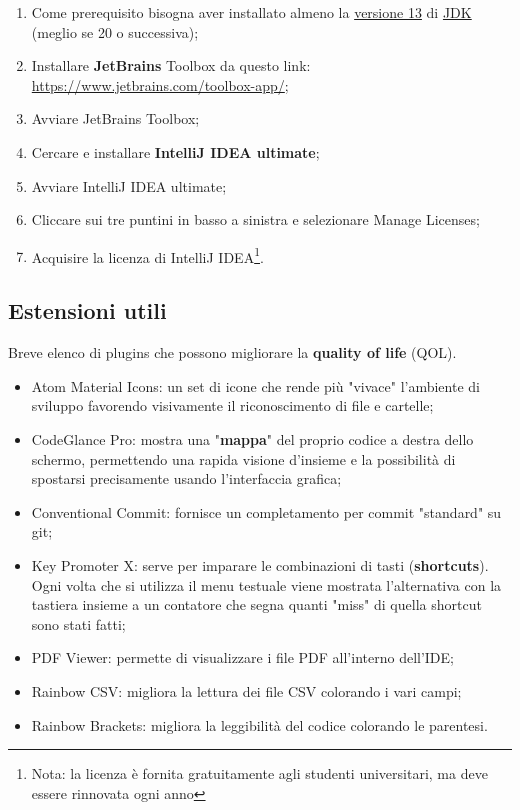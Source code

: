 \begin{enumerate}
    \item Come prerequisito bisogna aver installato almeno la \underline{versione 13} di \href{https://www.oracle.com/it/java/technologies/downloads/\#jdk21-windows}{JDK} (meglio se 20 o successiva);
    \item Installare \textbf{JetBrains} Toolbox da questo link: \href{https://www.jetbrains.com/toolbox-app/}{https://www.jetbrains.com/toolbox-app/};
    \item Avviare JetBrains Toolbox;
    \item Cercare e installare \textbf{IntelliJ IDEA ultimate};
    \item Avviare IntelliJ IDEA ultimate;
    \item Cliccare sui tre puntini in basso a sinistra e selezionare Manage Licenses;
    \item Acquisire la licenza di IntelliJ IDEA\footnote{Nota: la licenza è fornita gratuitamente agli studenti universitari, ma deve essere rinnovata ogni anno}.
\end{enumerate}


\subsection{Estensioni utili}

Breve elenco di plugins che possono migliorare la \textbf{quality of life} (QOL).

\begin{itemize}
    \item Atom Material Icons: un set di icone che rende più "vivace" l'ambiente di sviluppo favorendo visivamente il riconoscimento di file e cartelle;
    \item CodeGlance Pro: mostra una "\textbf{mappa}" del proprio codice a destra dello schermo, permettendo una rapida visione d'insieme e la possibilità di spostarsi precisamente usando l'interfaccia grafica;
    \item Conventional Commit: fornisce un completamento per commit "standard" su git;
    \item Key Promoter X: serve per imparare le combinazioni di tasti (\textbf{shortcuts}). Ogni volta che si utilizza il menu testuale viene mostrata l'alternativa con la tastiera insieme a un contatore che segna quanti "miss" di quella shortcut sono stati fatti;
    \item PDF Viewer: permette di visualizzare i file PDF all'interno dell'IDE;
    \item Rainbow CSV: migliora la lettura dei file CSV colorando i vari campi;
    \item Rainbow Brackets: migliora la leggibilità del codice colorando le parentesi.
\end{itemize}

